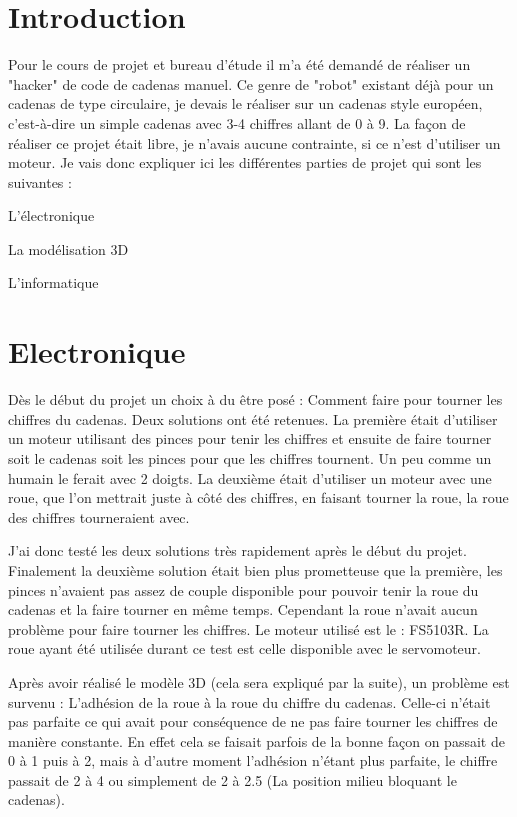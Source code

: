 \documentclass[twoside]{article}
\begin{document}
\begin{multicols}{2} %

\section{Introduction}
Pour le cours de projet et bureau d'étude il m'a été demandé de réaliser un "hacker" de code de cadenas manuel. Ce genre de "robot" existant déjà pour un cadenas de type circulaire, je devais le réaliser sur un cadenas style européen, c'est-à-dire un simple cadenas avec 3-4 chiffres allant de 0 à 9. La façon de réaliser ce projet était libre, je n'avais aucune contrainte, si ce n'est d'utiliser un moteur.
Je vais donc expliquer ici les différentes parties de projet qui sont les suivantes :
\begin{compactitem}
\item L'électronique
\item La modélisation 3D
\item L'informatique
\end{compactitem}


\section{Electronique}
Dès le début du projet un choix à du être posé : Comment faire pour tourner les chiffres du cadenas. Deux solutions ont été retenues. La première était d'utiliser un moteur utilisant des pinces pour tenir les chiffres et ensuite de faire tourner soit le cadenas soit les pinces pour que les chiffres tournent. Un peu comme un humain le ferait avec 2 doigts. La deuxième était d'utiliser un moteur avec une roue, que l'on mettrait juste à côté des chiffres, en faisant tourner la roue, la roue des chiffres tourneraient avec.

J'ai donc testé les deux solutions très rapidement après le début du projet. Finalement la deuxième solution était bien plus prometteuse que la première, les pinces n'avaient pas assez de couple disponible pour pouvoir tenir la roue du cadenas et la faire tourner en même temps. Cependant la roue n'avait aucun problème pour faire tourner les chiffres.
Le moteur utilisé est le : FS5103R. La roue ayant été utilisée durant ce test est celle disponible avec le servomoteur.

Après avoir réalisé le modèle 3D (cela sera expliqué par la suite), un problème est survenu : L'adhésion de la roue à la roue du chiffre du cadenas. Celle-ci n'était pas parfaite ce qui avait pour conséquence de ne pas faire tourner les chiffres de manière constante. En effet cela se faisait parfois de la bonne façon on passait de 0 à 1 puis à 2, mais à d'autre moment l'adhésion n'étant plus parfaite, le chiffre passait de 2 à 4 ou simplement de 2 à 2.5 (La position milieu bloquant le cadenas).


\end{multicols}
\end{document}
